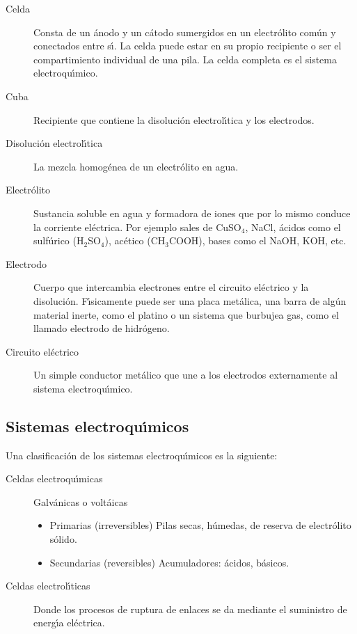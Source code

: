 \begin{description}
\item [Celda] Consta de un \'anodo y un c\'atodo 
sumergidos en un electr\'olito co\-m\'un y conectados entre
s\'{\i}.  La celda puede estar en su propio recipiente o ser el compartimiento individual de
una pila. La celda completa es el sistema electroqu\'{\i}mico.
\item[Cuba]  Recipiente que contiene la disoluci\'on
electrol\'{\i}tica y los electrodos.
\item [Disoluci\'on electrol\'{\i}tica] La mezcla homog\'enea de un
electr\'olito en agua.
\item[Electr\'olito]  Sustancia soluble en agua y formadora de iones
que por lo mismo conduce la corriente el\'ectrica. Por ejemplo
sales de CuSO$_4$, NaCl, \'acidos como el sulf\'urico 
(H$_2$SO$_4$), ac\'etico (CH$_3$COOH), bases como el NaOH, KOH, etc.
\item[Electrodo] Cuerpo que intercambia electrones entre el
circuito el\'ectrico y la disoluci\'on. F\'{\i}sicamente puede ser
una placa met\'alica, una barra de alg\'un material inerte, como
el platino o un sistema que burbujea gas, como el llamado electrodo
 de hidr\'ogeno.
\item[Circuito el\'ectrico] Un simple conductor met\'alico que une
a los electrodos externamente al sistema electroqu\'{\i}mico.
\end{description}

\subsection{Sistemas electroqu\'{\i}micos}
Una clasificaci\'on de los sistemas electroqu\'{\i}micos es la siguiente:
\begin{description}
\item[Celdas electroqu\'{\i}micas]
Galv\'anicas o volt\'aicas
\begin{itemize}
 \item Primarias (irreversibles) 
  Pilas secas, h\'umedas, de reserva de e\-lec\-tr\'olito s\'olido.
\item Secundarias (reversibles)
  Acumuladores: \'acidos,
b\'asicos.
\end{itemize}

\item[Celdas electrol\'{\i}ticas] Donde los procesos de ruptura de enlaces se da mediante
el suministro de energ\'{\i}a el\'ectrica.
\end{description}


